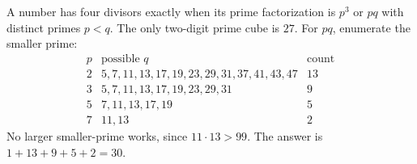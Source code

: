 A number has four divisors exactly when its prime factorization is $p^3$ or $pq$ with distinct primes $p<q$. The only two-digit prime cube is $27$.
For $pq$, enumerate the smaller prime:
\[
\begin{array}{c|c|c}
p&\text{possible }q&\text{count}\\ \hline
2&5,7,11,13,17,19,23,29,31,37,41,43,47&13\\
3&5,7,11,13,17,19,23,29,31&9\\
5&7,11,13,17,19&5\\
7&11,13&2
\end{array}
\]
No larger smaller-prime works, since $11\cdot13>99$. The answer is $\boxed{1+13+9+5+2=30}$.
